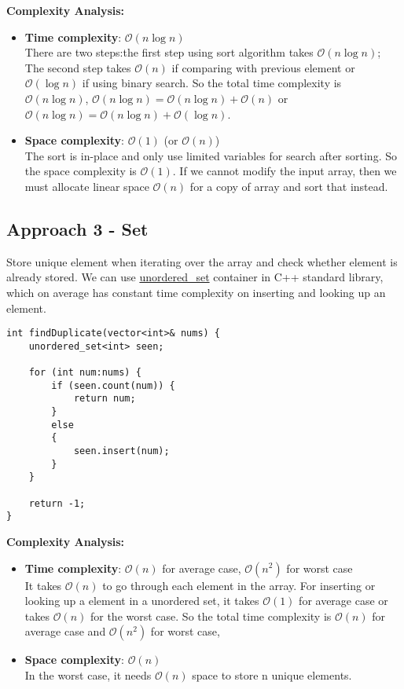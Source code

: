 \documentclass[justified]{tufte-book}
\begin{document}
\noindent \textbf{Complexity Analysis:}
\begin{itemize}
    \item \textbf{Time complexity}: $\mathcal{O}(n\log n)$ \\
    There are two steps:the first step using sort algorithm takes $\mathcal{O}(n\log n)$; The second step takes $\mathcal{O}(n)$ if comparing with previous element or $\mathcal{O}(\log n)$ if using binary search.  So the total time complexity is $\mathcal{O}(n\log n)$, $\mathcal{O}(n\log n)= \mathcal{O}(n\log n) + \mathcal{O}(n)$ or $\mathcal{O}(n\log n) = \mathcal{O}(n\log n) + \mathcal{O}(\log n)$.
    \item \textbf{Space complexity}: $\mathcal{O}(1)$ (or $\mathcal{O}(n)$) \\
    The sort is in-place and only use limited variables for search after sorting. So the space complexity is $\mathcal{O}(1)$. If we cannot modify the input array, then we must allocate linear space $\mathcal{O}(n)$ for a copy of array and sort that instead.
\end{itemize}

\subsection{Approach 3 - Set}
Store unique element when iterating over the array and check whether element is already stored. We can use \href{http://www.cplusplus.com/reference/unordered_set/unordered_set/}{unordered\_set} container in C++ standard library, which on average has constant time complexity on inserting and looking up an element. 
\begin{lstlisting}
int findDuplicate(vector<int>& nums) {
    unordered_set<int> seen;
    
    for (int num:nums) {
        if (seen.count(num)) {
            return num;
        }
        else
        {
            seen.insert(num);
        }
    }
    
    return -1; 
}  
\end{lstlisting}
\noindent \textbf{Complexity Analysis:}
\begin{itemize}
    \item \textbf{Time complexity}: $\mathcal{O}(n)$ for average case, $\mathcal{O}(n^2)$ for worst case\\
    It takes $\mathcal{O}(n)$ to go through each element in the array. For inserting or looking up a element in a unordered set, it takes $\mathcal{O}(1)$ for average case or takes $\mathcal{O}(n)$ for the worst case. So the total time complexity is $\mathcal{O}(n)$ for average case and $\mathcal{O}(n^2)$ for worst case, 
    \item \textbf{Space complexity}: $\mathcal{O}(n)$ \\
    In the worst case, it needs $\mathcal{O}(n)$ space to store n unique elements. 
\end{itemize}
\end{document}
